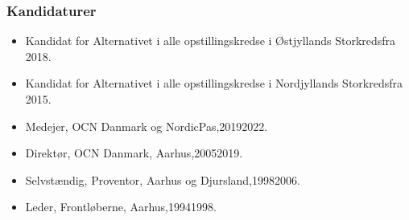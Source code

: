 \documentclass[11pt, a4paper]{awesome-cv}
\begin{document}
\begin{cvletter}
\subsubsection*{Kandidaturer}
\begin{itemize}
\item Kandidat for Alternativet i alle opstillingskredse i Østjyllands Storkredsfra 2018.
\item Kandidat for Alternativet i alle opstillingskredse i Nordjyllands Storkredsfra 2015.
\end{itemize}
\begin{itemize}
\item Medejer, OCN Danmark og NordicPas,20192022.
\item Direktør, OCN Danmark, Aarhus,20052019.
\item Selvstændig, Proventor, Aarhus og Djursland,19982006.
\item Leder, Frontløberne, Aarhus,19941998.
\end{itemize}
\end{cvletter}
\end{document}
